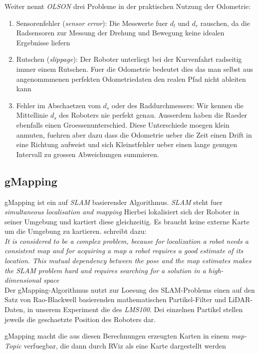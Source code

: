 \documentclass[11pt,a4paper]{article}
\begin{document}
Weiter nennt \textit{OLSON} drei Probleme in der praktischen Nutzung der Odometrie:
\begin{enumerate}
  \item Sensorenfehler (\textit{sensor error}):
  Die Messwerte fuer $d_l$ und $d_r$ rauschen, da die Radsensoren zur Messung der Drehung und Bewegung keine idealen Ergebnisse liefern
  \item Rutschen (\textit{slippage}):
  Der Roboter unterliegt bei der Kurvenfahrt radseitig immer einem Rutschen. Fuer die Odometrie bedeutet dies das man selbst aus angenommmenen perfekten Odometriedaten
  den realen Pfad nicht ableiten kann
  \item Fehler im Abschaetzen vom $d_s$ oder des Raddurchmessers:
  Wir kennen die Mittellinie $d_s$ des Roboters nie perfekt genau. Ausserdem haben die Raeder ebenfalls einen Groessenunterschied. Diese Unterschiede moegen klein 
  anmuten, fuehren aber dazu dass die Odometrie ueber die Zeit einen Drift in eine Richtung aufweist und sich Kleinstfehler ueber einen lange genugen Intervall zu grossen
  Abweichungen summieren. 
\end{enumerate}

\subsection*{gMapping}
gMapping ist ein auf \textit{SLAM} basierender Algorithmus. \textit{SLAM} steht fuer \textit{simultaneous localisation and mapping}\cite{website:mathworksSLAM}
Hierbei lokalisiert sich der Roboter in seiner Umgebung und kartiert diese gleichzeitig. Es braucht keine externe Karte um die Umgebung zu kartieren.
\cite{raoblackwellgmapping} schreibt dazu: \\
\textit{ It is
considered to be a complex problem, because for localization
a robot needs a consistent map and for acquiring a map a
robot requires a good estimate of its location. This mutual
dependency between the pose and the map estimates makes
the SLAM problem hard and requires searching for a solution
in a high-dimensional space} \\
Der gMapping-Algorithmus nutzt zur Loesung des SLAM-Problems einen auf den Satz von Rao-Blackwell basierenden mathematischen Partikel-Filter und LiDAR-Daten\cite{website:openslamgmapping},
in unserem Experiment die des \textit{LMS100}. Dei einzelnen Partikel stellen jeweils die geschaetzte Position des Roboters dar. 

gMapping macht die aus diesen Berechnungen erzeugten Karten in einem \textit{map-Topic} verfuegbar, die dann durch RViz als eine 
Karte dargestellt werden\cite{website:gmapping}
\end{document}
